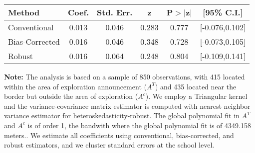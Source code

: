 \begin{table}[htbp]\centering
 \footnotesize 
\begin{tabular}{lccccc}
\hline\hline
Method & Coef. & Std. Err. & z & P$>|$z$|$ & [95\% C.I.] \\ 
\hline \hline  
Conventional & 0.013 & 0.046 & 0.283 & 0.777 & [-0.076,0.102] \\ 
 Bias-Corrected & 0.016 & 0.046 & 0.348 & 0.728 & [-0.073,0.105] \\ 
Robust & 0.016 & 0.064 & 0.248 & 0.804 & [-0.109,0.141] \\ 
  \hline\hline
\end{tabular}
\label{table:rd}
\begin{tablenotes} 
  \justifying \tiny \textbf{Note: }    
   The analysis is based on a sample of 850 observations, with 415 located within the area of exploration announcement ($A^{T}$) and 435 located near the border but outside the area of exploration  ($A^{c}$). 
           We employ a Triangular kernel and the variance-covariance matrix estimator is computed with nearest neighbor variance estimator for heteroskedasticity-robust. The global polynomial fit in  $A^{T}$ and $A^{c}$ is of order 1, the bandwith where the global polynomial fit is of 4349.158 meters.. We estimate all coefficients using conventional, bias-corrected, and robust estimators, and we cluster standard errors at the school level. \end{tablenotes} 
 \end{table} 
